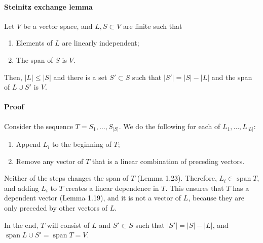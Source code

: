 \documentclass{article}
\begin{document}
\paragraph{Steinitz exchange lemma} Let $V$ be a vector space, and $L, S \subset V$ are finite such that

\begin{enumerate}
    \item Elements of $L$ are linearly independent;
    \item The span of $S$ is $V$.
\end{enumerate}

Then, $|L| \leq |S|$ and there is a set $S' \subset S$ such that $|S'| = |S| - |L|$ and the span of $L \cup S'$ is $V$.    

\paragraph{Proof}

Consider the sequence $T=S_1,\dots,S_{|S|}$. We do the following for each of $L_1,\dots,L_{|L|}$:

\begin{enumerate}
    \item Append $L_i$ to the beginning of $T$;
    \item Remove any vector of $T$ that is a linear combination of preceding vectors.
\end{enumerate}

Neither of the steps changes the span of $T$ (Lemma 1.23). Therefore, $L_i \in \operatorname{span} T$, and adding $L_i$ to $T$ creates a linear dependence in $T$. This ensures that $T$ has a dependent vector (Lemma 1.19), and it is not a vector of $L$, because they are only preceded by other vectors of $L$.

In the end, $T$ will consist of $L$ and $S' \subset S$ such that $|S'| = |S| - |L|$, and $\operatorname{span} L \cup S' = \operatorname{span} T = V$.
\end{document}
